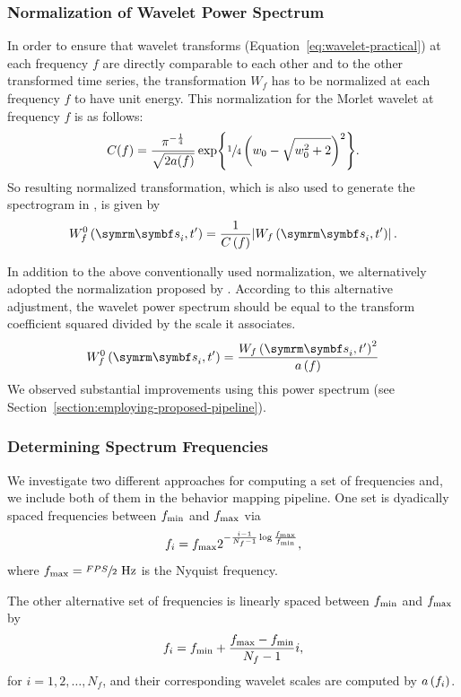 \subsubsection{Normalization of Wavelet Power Spectrum}
In order to ensure that wavelet transforms (Equation~\ref{eq:wavelet-practical}) at each frequency $f$ are directly comparable to each other and to the other transformed time series, the transformation $W_f$ has to be normalized at each frequency $f$ to have unit energy.
This normalization for the Morlet wavelet at frequency $f$ is as follows:
\begin{equation}
	C(f) = \frac{\pi^{-\frac{1}{4}}}{\sqrt{2a(f)}}\exp{\sfrac{1}{4}\left(w_0-\sqrt{w_0^2+2}\right)^2}.
\end{equation}
So resulting normalized transformation, which is also used to generate the spectrogram in \citet{berman_mapping_2014}, is given by
\begin{equation}
	W^0_f\rbr{\V{s}_i, t^\prime} = \frac{1}{C\rbr{f}} \abs*{W_f\rbr{\V{s}_i, t^\prime}}.
\end{equation}

In addition to the above conventionally used normalization, we alternatively adopted the normalization proposed by \citet{liu_rectification_2007}. According to this alternative adjustment, the wavelet power spectrum should be equal to the transform coefficient squared divided by the scale it associates.
\begin{equation}
	W^{0}_f\rbr{\V{s}_i, t^\prime} = \frac{W_f\rbr{\V{s}_i, t^\prime}^2}{a\rbr{f}}
\end{equation}
We observed substantial improvements using this power spectrum (see Section~\ref{section:employing-proposed-pipeline}).

\subsubsection{Determining Spectrum Frequencies}
We investigate two different approaches for computing a set of frequencies and, we include both of them in the behavior mapping pipeline.
One set is dyadically spaced frequencies between $f_{\textnormal{min}}$ and $f_{\textnormal{max}}$ via
\begin{equation}
	f_i = f_{\textnormal{max}} 2^{-\frac{i-1}{N_f-1}\log{\frac{f_{\textnormal{max}}}{f_{\textnormal{min}}}}},
\end{equation}
where $f_{\textnormal{max}} = \sfrac{FPS}{2} \textnormal{ Hz}$ is the Nyquist frequency.

The other alternative set of frequencies is linearly spaced between $f_{\textnormal{min}}$ and $f_{\textnormal{max}}$ by
\begin{equation}
	f_i = f_{\textnormal{min}} + \frac{f_{\textnormal{max}} - f_{\textnormal{min}}}{N_f-1}i,
\end{equation}
for $i=1,2,\dots,N_f$, and their corresponding wavelet scales are computed by $a\left(f_i\right)$.

